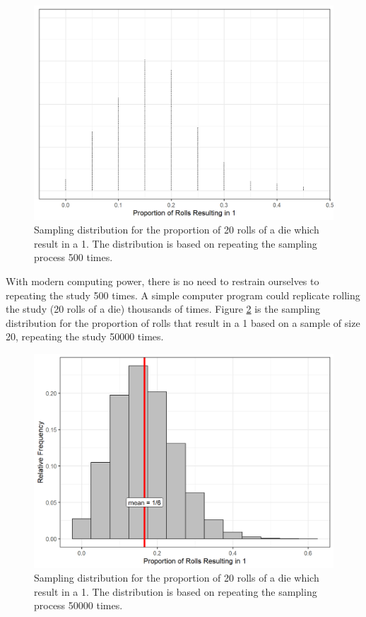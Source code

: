 \documentclass[
]{book}
\theoremstyle{plain}
\theoremstyle{mydefn}
\theoremstyle{myexmpl}
\theoremstyle{remark}
\begin{document}
\begin{figure}

{\centering \includegraphics[width=0.8\linewidth]{./Images/samplingdistns-dice-dotplot-1} 

}

\caption{Sampling distribution for the proportion of 20 rolls of a die which result in a 1.  The distribution is based on repeating the sampling process 500 times.}\label{fig:samplingdistns-dice-dotplot}
\end{figure}

With modern computing power, there is no need to restrain ourselves to repeating the study 500 times. A simple computer program could replicate rolling the study (20 rolls of a die) thousands of times. Figure \ref{fig:samplingdistns-dice-histogram} is the sampling distribution for the proportion of rolls that result in a 1 based on a sample of size 20, repeating the study 50000 times.

\begin{figure}

{\centering \includegraphics[width=0.8\linewidth]{./Images/samplingdistns-dice-histogram-1} 

}

\caption{Sampling distribution for the proportion of 20 rolls of a die which result in a 1.  The distribution is based on repeating the sampling process 50000 times.}\label{fig:samplingdistns-dice-histogram}
\end{figure}
\end{document}

